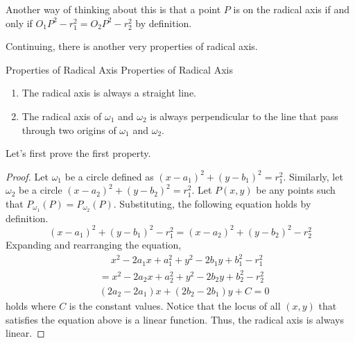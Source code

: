 \documentclass[../../../main.tex]{subfiles}
\begin{document}
Another way of thinking about this is that a point $P$ is on the
radical axis if and only if $O_1P^2 - r_1^2 = O_2P^2 - r_2^2$
by definition.

\begin{figure}[H]
\centering
{}
\end{figure}

Continuing, there is another very properties of radical axis.

\begin{theorem}
{Properties of Radical Axis}
{Properties of Radical Axis}
\begin{enumerate}
\item The radical axis is always a straight line.
\item The radical axis of $\omega_1$ and $\omega_2$ is always
perpendicular to the line that pass through two origins of
$\omega_1$ and $\omega_2$.
\end{enumerate}
\end{theorem}

Let's first prove the first property.

\begin{proof}
Let $\omega_1$ be a circle defined as $(x - a_1)^2 + (y - b_1)^2 =
r_1^2$. Similarly, let $\omega_2$ be a circle $(x - a_2)^2 +
(y - b_2)^2 = r_1^2$. Let $P(x, y)$ be any points such that
$P_{\omega_1}(P) = P_{\omega_2}(P)$. Substituting, the following
equation holds by definition.
\[
(x - a_1)^2 + (y - b_1)^2 - r_1^2 = (x - a_2)^2 + (y - b_2)^2 - r_2^2
\]
Expanding and rearranging the equation,
\begin{align*}
    &\quad\ x^2 - 2a_1 x + a_1^2 + y^2 - 2b_1 y + b_1^2 - r_1^2 \\
    &= x^2 - 2a_2 x + a_2^2 + y^2 - 2b_2 y + b_2^2 - r_2^2 \\
    &(2a_2 - 2a_1) x + (2b_2 - 2b_1) y + C = 0
\end{align*}
holds where $C$ is the constant values. Notice that the locus of
all $(x, y)$ that satisfies the equation above is a linear function.
Thus, the radical axis is always linear.
\end{proof}
\end{document}
